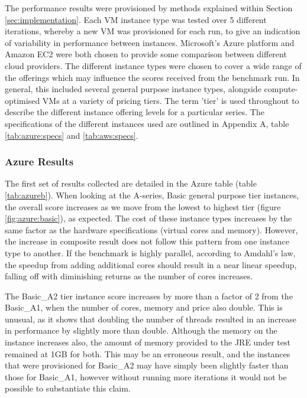 \documentclass{entcs} \usepackage{entcsmacro}
\begin{document}
The performance results were provisioned by methods explained within Section \ref{sec:implementation}. Each VM instance type was tested over 5 different iterations, whereby a new VM was provisioned for each run, to give an indication of variability in performance between instances. Microsoft's Azure platform and Amazon EC2 were both chosen to provide some comparison between different cloud providers. The different instance types were chosen to cover a wide range of the offerings which may influence the scores received from the benchmark run. In general, this included several general purpose instance types, alongside compute-optimised VMs at a variety of pricing tiers. The term 'tier' is used throughout to describe the different instance offering levels for a particular series. The specifications of the different instances used are outlined in Appendix A, table \ref{tab:azure:specs} and \ref{tab:aws:specs}.

\subsubsection{Azure Results}\label{sec:eval:azureresults}

The first set of results collected are detailed in the Azure table (table \ref{tab:azureb}). When looking at the A-series, Basic general purpose tier instances, the overall score increases as we move from the lowest to highest tier (figure \ref{fig:azure:basic}), as expected. The cost of these instance types increases by the same factor as the hardware specifications (virtual cores and memory). However, the increase in composite result does not follow this pattern from one instance type to another. If the benchmark is highly parallel, according to Amdahl's law, the speedup from adding additional cores should result in a near linear speedup, falling off with diminishing returns as the number of cores increases.

The Basic\_A2 tier instance score increases by more than a factor of 2 from the Basic\_A1, when the number of cores, memory and price also double. This is unusual, as it shows that doubling the number of threads resulted in an increase in performance by slightly more than double. Although the memory on the instance increases also, the amount of memory provided to the JRE under test remained at 1GB for both. This may be an erroneous result, and the instances that were provisioned for Basic\_A2 may have simply been slightly faster than those for Basic\_A1, however without running more iterations it would not be possible to substantiate this claim.
\end{document}
